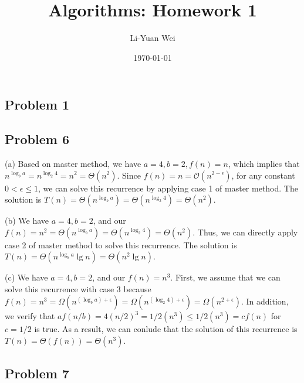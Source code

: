 \documentclass[a4paper]{article}
\makeatletter
\newenvironment{solution}
  {\begin{proof}[Solution]}
  {\end{proof}}
\renewenvironment{proof}[1][\proofname]{%
  \par\pushQED{\qed}\normalfont%
  \topsep6\p@\@plus6\p@\relax
  \trivlist\item[\hskip\labelsep\bfseries#1\@addpunct{.}]%
  \ignorespaces
}{%
  \popQED\endtrivlist\@endpefalse
}
\makeatother
\begin{document}
\title{Algorithms: Homework 1}
\author{Li-Yuan Wei}
\date{\today}
\maketitle

\subsection*{Problem 1}

\begin{solution}
\end{solution}

\subsection*{Problem 6}

\begin{solution}
  (a) Based on master method, we have $a = 4, b = 2, f(n) = n$, which implies that $n^{\log_{b}a} = n^{\log_{2}4} = n^2 = \Theta(n^2)$. Since $f(n) = n = \mathcal{O}(n^{2-\epsilon})$, for any constant $0 < \epsilon \le 1$, we can solve this recurrence by applying case 1 of master method. The solution is $T(n) = \Theta(n^{\log_{b}a}) = \Theta(n^{\log_{2}4}) = \Theta(n^2)$.
\end{solution}

\begin{solution}
  (b) We have $a = 4, b = 2$, and our $f(n) = n^2 = \Theta(n^{\log_{b}a}) = \Theta(n^{\log_{2}4}) = \Theta(n^2)$. Thus, we can directly apply case 2 of master method to solve this recurrence. The solution is $T(n) = \Theta(n^{\log_{b}a}\lg n) = \Theta(n^2\lg n)$.
\end{solution}

\begin{solution}
  (c) We have $a = 4, b = 2$, and our $f(n) = n^3$. First, we assume that we can solve this recurrence with case 3 because $f(n) = n^3 = \Omega(n^{(\log_{b}a) + \epsilon}) = \Omega(n^{(\log_{2}4) + \epsilon}) = \Omega(n^{2 + \epsilon})$. In addition, we verify that $af(n/b) = 4(n/2)^3 = 1/2(n^3) \le 1/2(n^3) = cf(n)$ for $c = 1/2$ is true. As a result, we can conlude that the solution of this recurrence is $T(n) = \Theta(f(n)) = \Theta(n^3)$.
\end{solution}

\subsection*{Problem 7}
\end{document}
